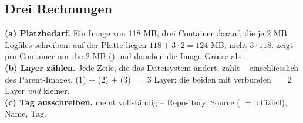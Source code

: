 \subsection{Drei Rechnungen}
\begin{bsp}
\textbf{(a) Platzbedarf.} Ein Image von 118 MB, drei Container darauf,
die je 2 MB Logfiles schreiben: auf der Platte liegen
$118 + 3\cdot 2 = 124$ MB, nicht $3\cdot 118$. 
zeigt pro Container nur die 2 MB () und daneben die Image-Grösse
als .\\[2pt]
\textbf{(b) Layer zählen.} Jede Zeile, die das Dateisystem ändert, zählt --
einschliesslich des Parent-Images.  (1) $+$  (2) $+$  (3) $=$ 3 Layer; die beiden
 mit \R{\&\&} verbunden $=$ 2 Layer \emph{und} kleiner.\\[2pt]
\textbf{(c) Tag ausschreiben.}  meint vollständig
 -- Repository, Source
( $=$ offiziell), Name, Tag.
\end{bsp}
